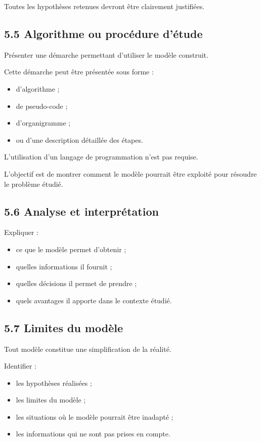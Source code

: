 \documentclass[12pt,a4paper]{article}
\begin{document}
Toutes les hypothèses retenues devront être clairement justifiées.

\subsection*{5.5 Algorithme ou procédure d'étude}

Présenter une démarche permettant d'utiliser le modèle construit.

Cette démarche peut être présentée sous forme :

\begin{itemize}
\item d'algorithme ;
\item de pseudo-code ;
\item d'organigramme ;
\item ou d'une description détaillée des étapes.
\end{itemize}

L'utilisation d'un langage de programmation n'est pas requise.

L'objectif est de montrer comment le modèle pourrait être exploité pour résoudre le problème étudié.

\subsection*{5.6 Analyse et interprétation}

Expliquer :

\begin{itemize}
\item ce que le modèle permet d'obtenir ;
\item quelles informations il fournit ;
\item quelles décisions il permet de prendre ;
\item quels avantages il apporte dans le contexte étudié.
\end{itemize}

\subsection*{5.7 Limites du modèle}

Tout modèle constitue une simplification de la réalité.

Identifier :

\begin{itemize}
\item les hypothèses réalisées ;
\item les limites du modèle ;
\item les situations où le modèle pourrait être inadapté ;
\item les informations qui ne sont pas prises en compte.
\end{itemize}
\end{document}
